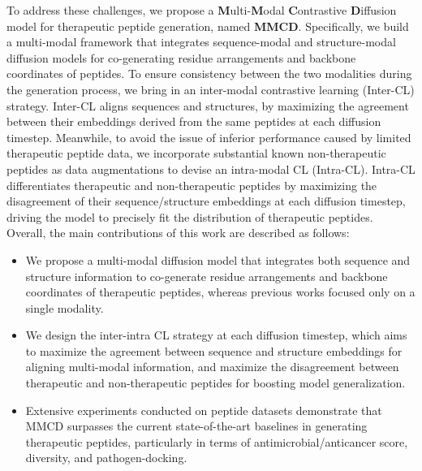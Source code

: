 \documentclass[letterpaper]{article} %
\begin{document}
To address these challenges, we propose a \textbf{M}ulti-\textbf{M}odal \textbf{C}ontrastive \textbf{D}iffusion model for therapeutic peptide generation, named \textbf{MMCD}. Specifically, we build a multi-modal framework that integrates sequence-modal and structure-modal diffusion models for co-generating residue arrangements and backbone coordinates of peptides. To ensure consistency between the two modalities during the generation process, we bring in an inter-modal contrastive learning (Inter-CL) strategy. Inter-CL aligns sequences and structures, by maximizing the agreement between their embeddings derived from the same peptides at each diffusion timestep. Meanwhile, to avoid the issue of inferior performance caused by limited therapeutic peptide data, we incorporate substantial known non-therapeutic peptides as data augmentations to devise an intra-modal CL (Intra-CL). Intra-CL differentiates therapeutic and non-therapeutic peptides by maximizing the disagreement of their sequence/structure embeddings at each diffusion timestep, driving the model to precisely fit the distribution of therapeutic peptides. Overall, the main contributions of this work are described as follows:
\begin{itemize}
\item We propose a multi-modal diffusion model that integrates both sequence and structure information to co-generate residue arrangements and backbone coordinates of therapeutic peptides, whereas previous works focused only on a single modality.
\item We design the inter-intra CL strategy at each diffusion timestep, which aims to maximize the agreement between sequence and structure embeddings for aligning multi-modal information, and maximize the disagreement between therapeutic and non-therapeutic peptides for boosting model generalization.
\item Extensive experiments conducted on peptide datasets demonstrate that MMCD surpasses the current state-of-the-art baselines in generating therapeutic peptides, particularly in terms of antimicrobial/anticancer score, diversity, and pathogen-docking.
\end{itemize}
\end{document}
